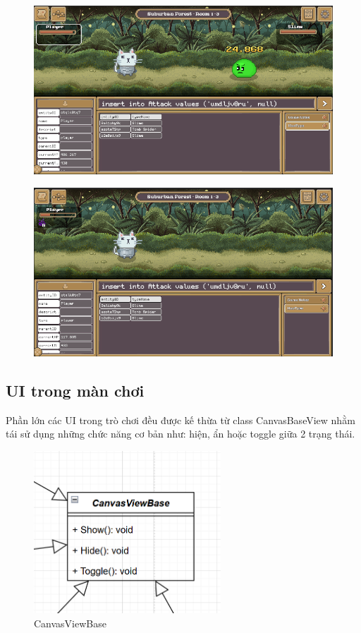\begin{figure}[H]
	\centering
	\includegraphics[width=13cm]{Images/gameplay7.png}
	\vspace{0.5cm}
	\caption{}
\end{figure}

\begin{figure}[H]
	\centering
	\includegraphics[width=13cm]{Images/gameplay8.png}
	\vspace{0.5cm}
	\caption{}
\end{figure}


\subsection{UI trong màn chơi}
Phần lớn các UI trong trò chơi đều được kế thừa từ class CanvasBaseView nhằm tái sử dụng những chức năng cơ bản như: hiện, ẩn hoặc toggle giữa 2 trạng thái.
\begin{figure}[H]
	\centering
	\includegraphics[width=7cm]{Images/CanvasViewBase.png}
	\vspace{0.5cm}
	\caption{CanvasViewBase}
\end{figure}

